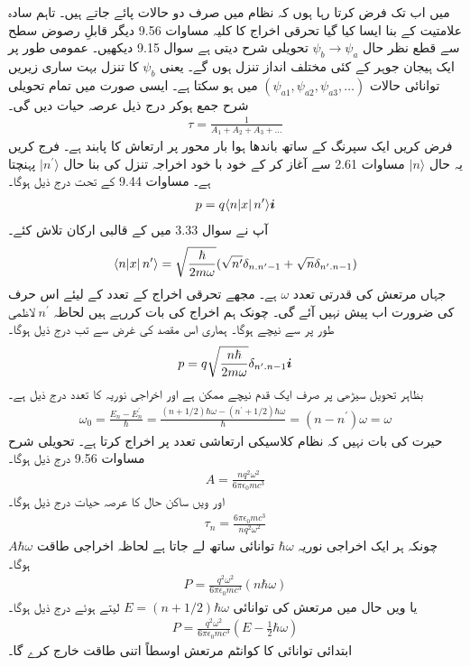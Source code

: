 میں اب تک فرض کرتا رہا ہوں کہ نظام میں صرف دو حالات پائے جاتے ہیں۔ تاہم سادہ علامتیت کے بنا ایسا کیا گیا تحرقی اخراج کا کلیہ مساوات \num{9.56} دیگر قابلِ رصوض سطح سے قطع نظر حال \(\psi_b \rightarrow \psi_a\) تحویلی شرح دیتی ہے سوال \num{9.15} دیکھیں۔ عمومی طور پر ایک ہیجان جوہر کے کئی مختلف انداز تنزل ہوں گے۔ یعنی \(\psi_b\) کا تنزل بہت ساری زیریں توانائی حالات \((\psi_{a1}, \psi_{a2}, \psi_{a3}, \dots)\) میں ہو سکتا ہے۔ ایسی صورت میں تمام تحویلی شرح جمع ہوکر درج ذیل عرصہ حیات دیں گی۔
\begin{align}
	\tau = \frac{1}{A_1+A_2+A_3+\dots}
\end{align}
فرض کریں ایک سپرنگ کے ساتھ باندھا ہوا بار  محور  پر ارتعاش کا پابند ہے۔ فرج کریں یہ حال \(\mid n \rangle\) مساوات \num{2.61} سے آغاز کر کے خود با خود اخراجہ تنزل کی بنا حال \(\mid n^\prime \rangle\) پہنچتا ہے۔ مساوات  \num{9.44} کے تحت درج ذیل ہوگا۔
\begin{align*}
	p = q\langle n\abs{x}n^\prime\rangle{\boldsymbol{i}}
\end{align*}
آپ نے سوال \num{3.33} میں  کے قالبی ارکان تلاش کئے۔
\begin{align*}
	\langle n\abs{x}n^\prime\rangle = \sqrt{\frac{\hbar}{2m\omega}}(\sqrt{n^\prime}\delta_{n.n^\prime-1}+\sqrt{n}\delta_{n^\prime.n-1})
\end{align*}
جہاں مرتعش کی قدرتی تعدد \(\omega\) ہے۔ مجھے تحرقی اخراج کے تعدد کے لیئے اس حرف کی ضرورت اب پیش نہیں آئے گی۔ چونک ہم اخراج کی بات کررہے ہیں لحاظہ \(n^\prime\) لاظمی طور پر  سے نیچے ہوگا۔ ہماری اس مقصد کی غرض سے تب درج ذیل ہوگا۔
\begin{align}
	p = q\sqrt{\frac{n\hbar}{2m\omega}}\delta_{n^\prime.n-1}{\boldsymbol{i}}
\end{align}
بظاہر تحویل سیڑھی پر صرف ایک قدم نیچے ممکن ہے اور اخراجی نوریہ کا تعدد درج ذیل ہے۔
\begin{align}
	\omega_0 = \frac{E_n-E_n^\prime}{\hbar} = \frac{(n+1/2)\hbar\omega - (n^\prime + 1/2)\hbar\omega}{\hbar} =(n-n^\prime)\omega = \omega
\end{align}
حیرت کی بات نہیں کہ نظام کلاسیکی ارتعاشی تعدد پر اخراج کرتا ہے۔ تحویلی شرح مساوات \num{9.56} درج ذیل ہوگا۔
\begin{align}
	A = \frac{nq^2\omega^2}{6\pi\epsilon_0mc^3}
\end{align}
اور ویں ساکن حال کا عرصہ حیات درج ذیل ہوگا۔
\begin{align}
	\tau_n = \frac{6\pi\epsilon_0mc^3}{nq^2\omega^2}
\end{align}
چونکہ ہر ایک اخراجی نوریہ \(\hbar\omega\) توانائی ساتھ لے جاتا ہے لحاظہ اخراجی طاقت \(A\hbar\omega\) ہوگا۔
\begin{align*}
	P = \frac{q^2\omega^2}{6\pi\epsilon_0mc^3}(n\hbar\omega)
\end{align*}
یا ویں حال میں مرتعش کی توانائی \(E = (n+1/2)\hbar\omega\) لیتے ہوئے درج ذیل ہوگا۔
\begin{align}
	P = \frac{q^2\omega^2}{6\pi\epsilon_0mc^3}(E-\frac{1}{2}\hbar\omega)
\end{align}
ابتدائی توانائی  کا کوانٹم مرتعش اوسطاً اتنی طاقت خارج کرے گا۔

